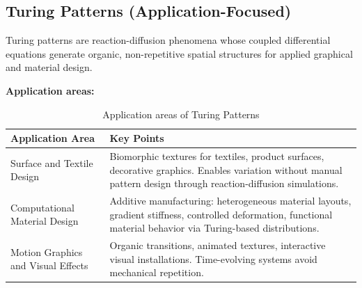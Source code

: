 \subsection{Turing Patterns (Application-Focused)}
Turing patterns are reaction-diffusion phenomena whose coupled differential equations generate organic, non-repetitive spatial structures for applied graphical and material design.

\textbf{Application areas:}
\begin{table}[H]
\caption{Application areas of Turing Patterns}
\centering
\begin{tabular}{|p{4cm}|p{13cm}|}
\hline
\textbf{Application Area} & \textbf{Key Points} \\
\hline
Surface and Textile Design & Biomorphic textures for textiles, product surfaces, decorative graphics. Enables variation without manual pattern design through reaction-diffusion simulations. \\
\hline
Computational Material Design & Additive manufacturing: heterogeneous material layouts, gradient stiffness, controlled deformation, functional material behavior via Turing-based distributions. \\
\hline
Motion Graphics and Visual Effects & Organic transitions, animated textures, interactive visual installations. Time-evolving systems avoid mechanical repetition. \\
\hline
\end{tabular}
\end{table}


